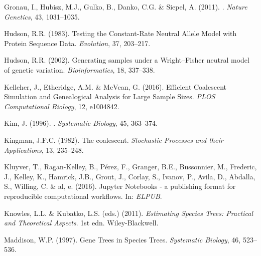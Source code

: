 \documentclass[11pt]{article}
\begin{document}
\begin{thebibliography}{25}
Gronau, I., Hubisz, M.J., Gulko, B., Danko, C.G. \& Siepel, A. (2011).
.
\newblock \emph{Nature Genetics}, 43, 1031--1035.

Hudson, R.R. (1983).
\newblock Testing the {Constant}-{Rate} {Neutral} {Allele} {Model} with
  {Protein} {Sequence} {Data}.
\newblock \emph{Evolution}, 37, 203--217.

Hudson, R.R. (2002).
\newblock Generating samples under a {Wright}–{Fisher} neutral model of
  genetic variation.
\newblock \emph{Bioinformatics}, 18, 337--338.

Kelleher, J., Etheridge, A.M. \& McVean, G. (2016).
\newblock Efficient {Coalescent} {Simulation} and {Genealogical} {Analysis} for
  {Large} {Sample} {Sizes}.
\newblock \emph{PLOS Computational Biology}, 12, e1004842.

Kim, J. (1996).
.
\newblock \emph{Systematic Biology}, 45, 363--374.

Kingman, J.F.C. (1982).
\newblock The coalescent.
\newblock \emph{Stochastic Processes and their Applications}, 13, 235--248.

Kluyver, T., Ragan-Kelley, B., Pérez, F., Granger, B.E., Bussonnier, M.,
  Frederic, J., Kelley, K., Hamrick, J.B., Grout, J., Corlay, S., Ivanov, P.,
  Avila, D., Abdalla, S., Willing, C. \& al, e. (2016).
\newblock Jupyter {Notebooks} - a publishing format for reproducible
  computational workflows.
\newblock In: \emph{{ELPUB}}.

Knowles, L.L. \& Kubatko, L.S. (eds.)  (2011).
\newblock \emph{Estimating {Species} {Trees}: {Practical} and {Theoretical}
  {Aspects}}.
\newblock 1st edn.
\newblock Wiley-Blackwell.

Maddison, W.P. (1997).
\newblock Gene {Trees} in {Species} {Trees}.
\newblock \emph{Systematic Biology}, 46, 523--536.


\end{thebibliography}
\end{document}
